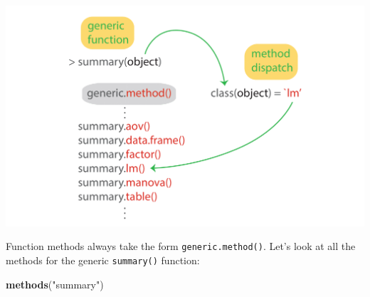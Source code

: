 \documentclass[
]{book}
\newenvironment{Shaded}{\begin{snugshade}}{\end{snugshade}}
\newcommand{\KeywordTok}[1]{\textcolor[rgb]{0.13,0.29,0.53}{\textbf{#1}}}
\newcommand{\NormalTok}[1]{#1}
\newcommand{\StringTok}[1]{\textcolor[rgb]{0.31,0.60,0.02}{#1}}
\begin{document}
\includegraphics{R/Rmodels/images/methods.png}

Function methods always take the form \texttt{generic.method()}. Let's look at all the methods for the generic \texttt{summary()} function:

\begin{Shaded}
\begin{Highlighting}[]
\KeywordTok{methods}\NormalTok{(}\StringTok{"summary"}\NormalTok{)}
\end{Highlighting}
\end{Shaded}
\end{document}

